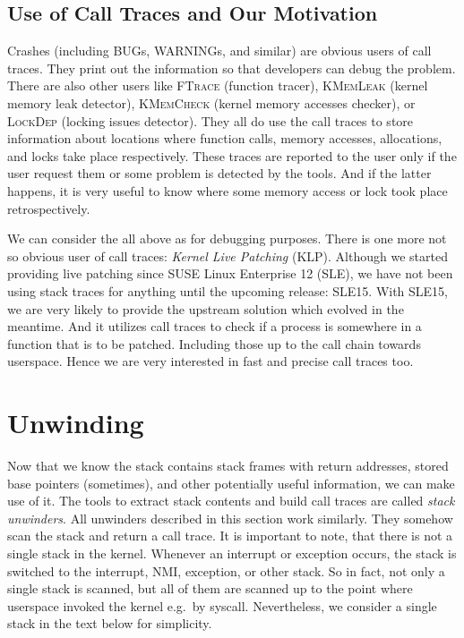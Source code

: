 \documentclass[10pt]{llncs}
\begin{document}
\subsection{Use of Call Traces and Our Motivation} \label{sec:uses}
Crashes (including BUGs, WARNINGs, and similar) are obvious users of call
traces. They print out the information so that developers can debug the
problem. There are also other users like \textsc{FTrace} (function tracer),
\textsc{KMemLeak} (kernel memory leak detector), \textsc{KMemCheck} (kernel
memory accesses checker), or \textsc{LockDep} (locking issues detector).  They
all do use the call traces to store information about locations where function
calls, memory accesses, allocations, and locks take place respectively. These
traces are reported to the user only if the user request them or some problem
is detected by the tools. And if the latter happens, it is very useful to know
where some memory access or lock took place retrospectively.

We can consider the all above as for debugging purposes. There is one more not
so obvious user of call traces: \textit{Kernel Live Patching} (KLP). Although
we started providing live patching since SUSE Linux Enterprise 12 (SLE), we
have not been using stack traces for anything until the upcoming release:
SLE15. With SLE15, we are very likely to provide the upstream solution which
evolved in the meantime. And it utilizes call traces to check if a process is
somewhere in a function that is to be patched. Including those up to the call
chain towards userspace. Hence we are very interested in fast and precise
call traces too.

\section{Unwinding} \label{sec:unwinding}
Now that we know the stack contains stack frames with return addresses,
stored base pointers (sometimes), and other potentially useful information, we
can make use of it. The tools to extract stack contents and build call traces
are called \emph{stack unwinders}.  All unwinders described in this section
work similarly. They somehow scan the stack and return a call trace. It is
important to note, that there is not a single stack in the kernel. Whenever an
interrupt or exception occurs, the stack is switched to the interrupt, NMI,
exception, or other stack. So in fact, not only a single stack is scanned, but
all of them are scanned up to the point where userspace invoked the kernel
e.g.\ by syscall. Nevertheless, we consider a single stack in the text below
for simplicity.
\end{document}
